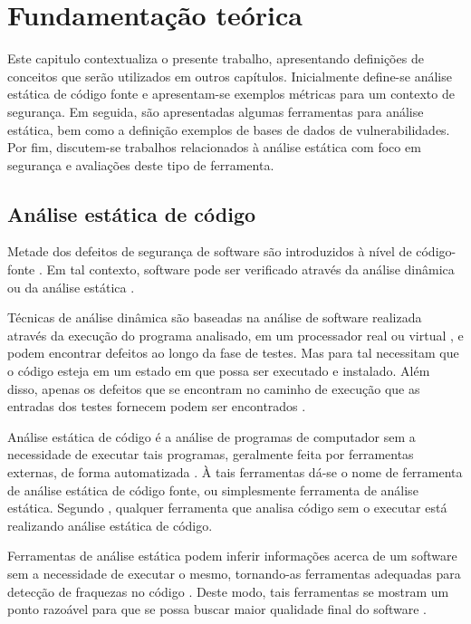 \chapter{Fundamentação teórica}\label{fundamentacao_teorica}

Este capitulo contextualiza o presente trabalho, apresentando definições de conceitos que serão utilizados em outros capítulos. Inicialmente define-se análise estática de código fonte e apresentam-se exemplos métricas para um contexto de segurança. Em seguida, são apresentadas algumas ferramentas para análise estática, bem como a definição exemplos de bases de dados de vulnerabilidades. Por fim, discutem-se trabalhos relacionados à análise estática com foco em segurança e avaliações deste tipo de ferramenta.

\section{Análise estática de código}\label{fundamentacao_teorica:analise_estatica_de_codigo}

Metade dos defeitos de segurança de software são introduzidos à nível de código-fonte \cite{vadim}. Em tal contexto, software pode ser verificado através da análise dinâmica ou da análise estática \cite{concolic}.

Técnicas de análise dinâmica são baseadas na análise de software realizada através da execução do programa analisado, em um processador real ou virtual \cite{concolic}, e podem encontrar defeitos ao longo da fase de testes. Mas para tal necessitam que o código esteja em um estado em que possa ser executado e instalado. Além disso, apenas os defeitos que se encontram no caminho de execução que as entradas dos testes fornecem podem ser encontrados \cite{harvard}.

Análise estática de código é a análise de programas de computador sem a necessidade de executar tais programas, geralmente feita por ferramentas externas, de forma automatizada \cite{kannavara}. À tais ferramentas dá-se o nome de ferramenta de análise estática de código fonte, ou simplesmente ferramenta de análise estática. Segundo \cite{secure_programming}, qualquer ferramenta que analisa código sem o executar está realizando análise estática de código.

Ferramentas de análise estática podem inferir informações  acerca de um software sem a necessidade de executar o mesmo, tornando-as ferramentas adequadas para detecção de fraquezas no código \cite{vadim}. Deste modo, tais ferramentas se mostram um ponto razoável para que se possa buscar maior qualidade final do software \cite{sa_spec}.

